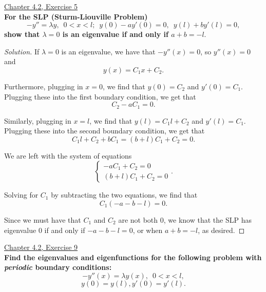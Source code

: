 \documentclass[11pt]{article}
\newenvironment{solution}
  {\renewcommand\qedsymbol{$\blacksquare$}\begin{proof}[Solution]}
  {\end{proof}}
\begin{document}
\underline{Chapter 4.2, Exercise 5} \\

\textbf{For the SLP (Sturm-Liouville Problem)} \[-y'' = \lambda y, \, \, \, 0 < x < l; \, \, \, y(0) - ay'(0) = 0, \, \, \, y(l) + by'(l) = 0,\]
\textbf{show that $\lambda = 0$ is an eigenvalue if and only if $a+b = -l.$} \\

\begin{solution}
If $\lambda = 0$ is an eigenvalue, we have that $-y''(x) = 0$, so $y''(x) = 0$ and \[y(x) = C_1x + C_2.\]

Furthermore, plugging in $x = 0$, we find that $y(0) = C_2$ and $y'(0) = C_1$. Plugging these into the first boundary condition, we get that
\[ C_2 - aC_1 = 0.\]

Similarly, plugging in $x = l$, we find that $y(l) = C_1 l + C_2$ and $y'(l) = C_1$. Plugging these into the second boundary condition, we get that 
\[ C_1l + C_2 + bC_1 = (b+l) C_1 + C_2 = 0.\]

We are left with the system of equations
\[ \begin{cases}
    -aC_1 + C_2 = 0 \\
    (b+l)C_1 + C_2 = 0
\end{cases}. \]

Solving for $C_1$ by subtracting the two equations, we find that
\[ C_1(-a-b-l) = 0.\]

Since we must have that $C_1$ and $C_2$ are not both $0$, we know that the SLP has eigenvalue $0$ if and only if $-a-b-l = 0$, or when $a+b = -l$, as desired.
\end{solution}

\newpage

\underline{Chapter 4.2, Exercise 9} \\

\textbf{Find the eigenvalues and eigenfunctions for the following problem with \textit{periodic} boundary conditions:}
\[ -y''(x) = \lambda y(x), \, \, \, 0 < x < l, \]
\[ y(0) = y(l), y'(0) = y'(l).\]
\end{document}
